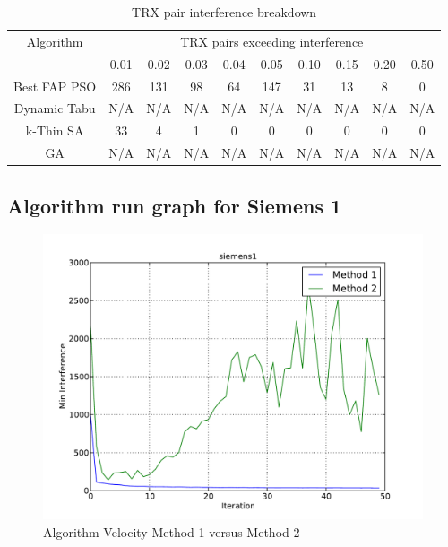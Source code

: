 \begin{table}[H]
\centering
	\begin{tabular}{cccccccccc}
	\toprule
    Algorithm & \multicolumn{9}{c}{TRX pairs exceeding interference}\\
    & 0.01 & 0.02 & 0.03 & 0.04 & 0.05 & 0.10 & 0.15 & 0.20 & 0.50 \\
    \midrule
    Best FAP PSO & 286 & 131 & 98 & 64 & 147 & 31 & 13 & 8 & 0\\
    Dynamic Tabu & \scriptsize{N/A} & \scriptsize{N/A} & \scriptsize{N/A} & \scriptsize{N/A} & \scriptsize{N/A} & \scriptsize{N/A} & \scriptsize{N/A} & \scriptsize{N/A} & \scriptsize{N/A}\\
    k-Thin SA & 33 & 4 & 1 & 0 & 0 & 0 & 0 & 0 & 0 \\
    GA & \scriptsize{N/A} & \scriptsize{N/A} & \scriptsize{N/A} & \scriptsize{N/A} & \scriptsize{N/A} & \scriptsize{N/A} & \scriptsize{N/A} & \scriptsize{N/A} & \scriptsize{N/A}\\
    \bottomrule
	\end{tabular}
\caption{TRX pair interference breakdown}
\label{tab:breakdown-siem1m1}
\end{table}

\subsection{Algorithm run graph for Siemens 1}
\begin{figure}[H]
	\begin{centering}
    \includegraphics[scale=0.50]{../Implementation/data-cruncher/graph/siemens1.pdf}
	\caption{Algorithm Velocity Method 1 versus Method 2}
	\label{fig:siem1graph}
	\end{centering}
\end{figure}



